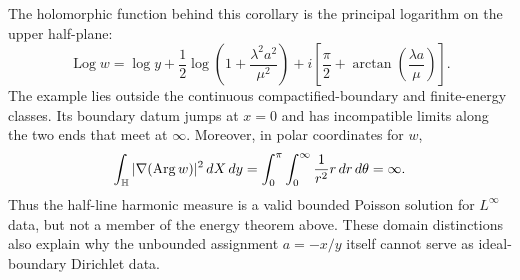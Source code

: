 The holomorphic function behind this corollary is the principal logarithm on
the upper half-plane:
\begin{equation}\label{eq:log-w-assignment}
 \operatorname{Log} w
 =\log y+\frac12\log\left(1+\frac{\lambda^2a^2}{\mu^2}\right)
 +i\left[
   \frac\pi2+\arctan\!\left(\frac{\lambda a}{\mu}\right)
 \right].
\end{equation}
The example lies outside the continuous compactified-boundary and finite-energy
classes.  Its boundary datum jumps at $x=0$ and has incompatible limits along
the two ends that meet at $\infty$.  Moreover, in polar coordinates for $w$,
\[
 \int_{\mathbb{H}}|\nabla(\operatorname{Arg} w)|^2\,dX\,dy
 =\int_0^\pi\int_0^\infty\frac1{r^2}r\,dr\,d\theta
 =\infty.
\]
Thus the half-line harmonic measure is a valid bounded Poisson solution for
$L^\infty$ data, but not a member of the energy theorem above.  These domain
distinctions also explain why the unbounded assignment $a=-x/y$ itself cannot
serve as ideal-boundary Dirichlet data.
